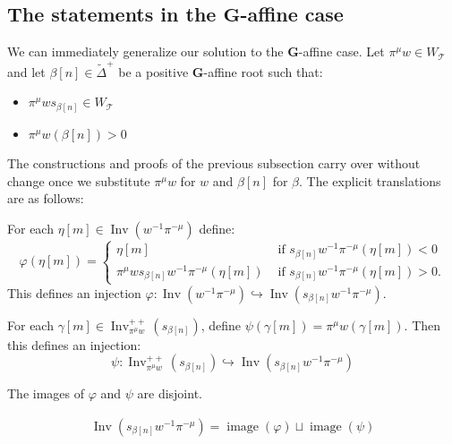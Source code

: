 \documentclass[ALCO,ThmDefs,Unicode]{cedram}
\DeclareMathOperator{\im}{image}
\DeclareMathOperator{\Inv}{Inv}
\newcommand{\bG}{\mathbf{G}}
\newcommand{\cT}{\mathcal{T}}
\newcommand{\WTits}{W_{\TitsCone}}
\newcommand{\TitsCone}{\cT}
\newcommand{\textif}{\text{ if }}
\newcommand{\tDelta}{\widetilde{\Delta}}
\begin{document}
\subsection{The statements in the \texorpdfstring{$\bG$}{G}-affine case}\label{SS:double-affine-maps}

We can immediately generalize our solution to the $\bG$-affine case. Let $\pi^\mu w \in \WTits$ and let $\beta[n]\in\tDelta^+$ be a positive $\bG$-affine root such that:
\begin{itemize}
\item $\pi^\mu w s_{\beta[n]} \in \WTits$
\item $\pi^\mu w(\beta[n]) > 0$
\end{itemize}
The constructions and proofs of the previous subsection carry over without change once we substitute $\pi^\mu w$ for $w$ and $\beta[n]$ for $\beta$. The explicit translations are as follows:

\begin{prop}
For each $\eta[m] \in \Inv(w^{-1} \pi^{-\mu})$ define:
\begin{equation}\label{eq:53H}
\varphi(\eta[m]) =
\begin{cases}
\eta[m] & \textif s_{\beta[n]} w^{-1} \pi^{-\mu} (\eta[m]) < 0 \\
\pi^\mu w s_{\beta[n]} w^{-1} \pi^{-\mu} (\eta[m]) & \textif s_{\beta[n]} w^{-1} \pi^{-\mu} (\eta[m]) > 0.
\end{cases}
\end{equation}
This defines an injection $\varphi : \Inv(w^{-1} \pi^{-\mu}) \hookrightarrow \Inv(s_{\beta[n]} w^{-1} \pi^{-\mu})$.
\end{prop}

\begin{prop}\label{prop-psi-is-injective-double-affine}
For each $\gamma[m] \in \Inv^{++}_{\pi^\mu w}(s_{\beta[n]})$, define $\psi(\gamma[m]) = \pi^\mu w (\gamma[m])$. Then this defines an injection:
\begin{equation}\label{eq:54H}
\psi : \Inv^{++}_{\pi^\mu w} (s_{\beta[n]}) \hookrightarrow \Inv(s_{\beta[n]} w^{-1} \pi^{-\mu})
\end{equation}
\end{prop}

\begin{prop}
The images of $\varphi$ and $\psi$ are disjoint.
\end{prop}

\begin{coro}
\begin{align}\label{eq:55H}
\Inv(s_{\beta[n]} w^{-1} \pi^{-\mu}) = \im(\varphi) \sqcup \im(\psi)
\end{align}
\end{coro}
\end{document}
